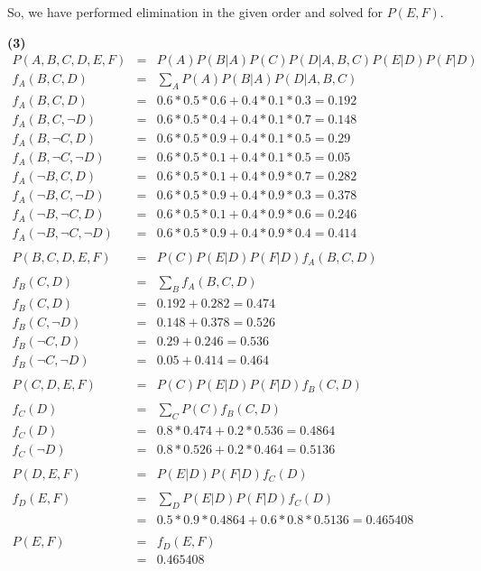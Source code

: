 \documentclass[11pt]{article}
\renewcommand{\part}[1] {\vspace{.10in} {\bf (#1)}}
\begin{document}
So, we have performed elimination in the given order and solved for $P(E, F)$. 

\part{3}
\begin{eqnarray*}
P(A, B, C, D, E, F) &=& P(A)P(B|A)P(C)P(D|A,B,C)P(E|D)P(F|D)\\
f_A(B, C, D) &=& \sum_A P(A)P(B|A)P(D|A,B,C)\\
f_A(B, C, D) &=& 0.6*0.5*0.6 + 0.4*0.1*0.3 = 0.192\\
f_A(B, C, \neg D) &=& 0.6*0.5*0.4+0.4*0.1*0.7 = 0.148\\
f_A(B, \neg C, D) &=& 0.6*0.5*0.9+0.4*0.1*0.5 = 0.29\\
f_A(B, \neg C, \neg D) &=& 0.6*0.5*0.1+0.4*0.1*0.5 = 0.05\\
f_A(\neg B, C, D) &=& 0.6*0.5*0.1+0.4*0.9*0.7 = 0.282\\
f_A(\neg B, C,\neg  D) &=& 0.6*0.5*0.9+0.4*0.9*0.3 = 0.378\\
f_A(\neg B, \neg C, D) &=& 0.6*0.5*0.1+0.4*0.9*0.6 = 0.246\\
f_A(\neg B, \neg C, \neg D) &=& 0.6*0.5*0.9+0.4*0.9*0.4 = 0.414\\
\\
P(B, C, D, E, F) &=& P(C)P(E|D)P(F|D)f_A(B, C, D)\\
\\
f_B(C, D) &=& \sum_B f_A(B, C, D)\\
f_B(C, D) &=& 0.192 + 0.282 = 0.474\\
f_B(C, \neg D) &=& 0.148 + 0.378 = 0.526\\
f_B(\neg C, D) &=& 0.29 + 0.246 = 0.536\\
f_B(\neg C, \neg D) &=& 0.05 + 0.414 = 0.464\\
\\
P(C, D, E, F) &=& P(C)P(E|D)P(F|D)f_B(C, D)\\
\\
f_C(D) &=& \sum_C P(C)f_B(C, D)\\
f_C(D) &=& 0.8 * 0.474 + 0.2 * 0.536 = 0.4864\\
f_C(\neg D) &=& 0.8 * 0.526 + 0.2 * 0.464 = 0.5136\\
\\
P(D, E, F) &=& P(E|D)P(F|D)f_C(D)\\
\\
f_D(E, F) &=& \sum_D P(E|D)P(F|D)f_C(D)\\
&=& 0.5*0.9*0.4864 + 0.6*0.8*0.5136 = 0.465408\\
\\
P(E, F) &=& f_D(E, F)\\
&=& 0.465408\\
\end{eqnarray*}
\end{document}
